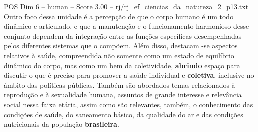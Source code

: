\begin{textsample}{POS Dim 6 – human – Score 3.00 – rj/rj\_ef\_ciencias\_da\_natureza\_2\_p13.txt}  \label{ex:f6_pos_010}
Outro foco dessa unidade é a percepção de que o corpo humano é um todo dinâmico e articulado, e que a manutenção e o funcionamento harmonioso desse conjunto dependem da integração entre as funções específicas desempenhadas pelos diferentes sistemas que o compõem.
Além disso, destacam -se aspectos relativos à saúde, compreendida não somente como um estado de equilíbrio dinâmico do corpo, mas como um bem da coletividade, \textbf{abrindo} espaço para discutir o que é preciso para promover a saúde individual e \textbf{coletiva}, inclusive no âmbito das políticas públicas.
Também são abordados temas relacionados à reprodução e à sexualidade humana, assuntos de grande interesse e relevância social nessa faixa etária, assim como são relevantes, também, o conhecimento das condições de saúde, do saneamento básico, da qualidade do ar e das condições nutricionais da população \textbf{brasileira}.

\end{textsample}
